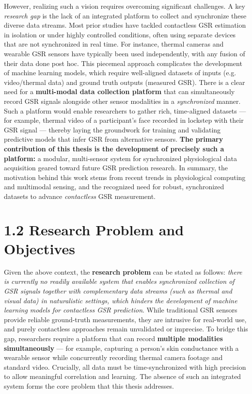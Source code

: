 However, realizing such a vision requires overcoming significant
challenges. A key \textit{research gap} is the lack of an integrated platform
to collect and synchronize these diverse data streams. Most prior
studies have tackled contactless GSR estimation in isolation or under
highly controlled conditions, often using separate devices that are not
synchronized in real
time\cite{ElectrodermalActivityWiki}\cite{DeviceServer}.
For instance, thermal cameras and wearable GSR sensors have typically
been used independently, with any fusion of their data done post hoc.
This piecemeal approach complicates the development of machine learning
models, which require well-aligned datasets of inputs (e.g.
video/thermal data) and ground truth outputs (measured GSR). There is a
clear need for a \textbf{multi-modal data collection platform} that can
simultaneously record GSR signals alongside other sensor modalities in a
\textit{synchronized} manner. Such a platform would enable researchers to
gather rich, time-aligned datasets --- for example, thermal video of a
participant's face recorded in lockstep with their GSR signal --- thereby
laying the groundwork for training and validating predictive models that
infer GSR from alternative sensors. \textbf{The primary contribution of this
thesis is the development of precisely such a platform:} a modular,
multi-sensor system for synchronized physiological data acquisition
geared toward future GSR prediction research. In summary, the motivation
behind this work stems from recent trends in physiological computing and
multimodal sensing, and the recognized need for robust, synchronized
datasets to advance \textit{contactless} GSR measurement.

\section{1.2 Research Problem and Objectives}

Given the above context, the \textbf{research problem} can be stated as
follows: \textit{there is currently no readily available system that enables
synchronized collection of GSR signals together with complementary data
streams (such as thermal and visual data) in naturalistic settings,
which hinders the development of machine learning models for contactless
GSR prediction}. While traditional GSR sensors provide reliable
ground-truth measurements, they are intrusive for real-world use, and
purely contactless approaches remain unvalidated or
imprecise\cite{ElectrodermalActivityWiki}.
To bridge this gap, researchers require a platform that can record
\textbf{multiple modalities simultaneously} --- for example, capturing a
person's skin conductance with a wearable sensor while concurrently
recording thermal camera footage and standard video. Crucially, all data
must be time-synchronized with high precision to allow meaningful
correlation and learning. The absence of such an integrated system forms
the core problem that this thesis addresses.

